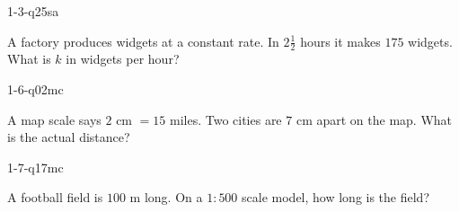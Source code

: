 
\begin{practiceQuestion}{1-3-q25}{sa}
\begin{questionText}
A factory produces widgets at a constant rate. In $2\frac{1}{2}$ hours it makes $175$ widgets. What is $k$ in widgets per hour?
\end{questionText}
\end{practiceQuestion}

\begin{practiceQuestion}{1-6-q02}{mc}
\begin{questionText}
A map scale says $2$ cm $= 15$ miles. Two cities are $7$ cm apart on the map. What is the actual distance?
\end{questionText}
\end{practiceQuestion}

\begin{practiceQuestion}{1-7-q17}{mc}
\begin{questionText}
A football field is $100$ m long. On a $1 : 500$ scale model, how long is the field?
\end{questionText}
\end{practiceQuestion}

